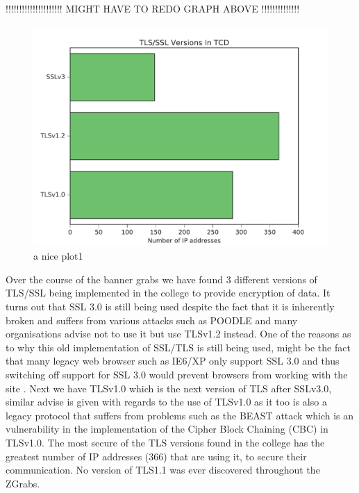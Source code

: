 \documentclass[a4wide,leqno,12pt]{report}
\begin{document}
!!!!!!!!!!!!!!!!!!!!! MIGHT HAVE TO REDO GRAPH ABOVE !!!!!!!!!!!!!!\\



\begin{figure}[h!]
\includegraphics[scale=.5]{pdf_images/TLSVersionsInTCD}
\caption{a nice plot1}
\label{fig:TLS_SSL}
\end{figure}

Over the course of the banner grabs we have found 3 different versions of TLS/SSL being implemented in the college to provide encryption of data. It turns out that SSL 3.0 is still being used despite the fact that it is inherently broken and suffers from various attacks such as POODLE\cite{holz2015summarizing} \cite{moller2014poodle} and many organisations \cite{ssllabs} advise not to use it  but use TLSv1.2 instead. One of the reasons as to why this old implementation of SSL/TLS is still being used, might be the fact that many legacy web browser such as IE6/XP only support SSL 3.0 and thus switching off support for SSL 3.0 would prevent browsers from working with the site \cite{owaspTLS_SSL}. Next we have TLSv1.0 which is the next version of TLS after SSLv3.0, similar advise is given with regards to the use of TLSv1.0 as it too is also a legacy protocol that suffers from problems such as the BEAST attack\cite{holz2015summarizing} which is an vulnerability in the implementation of the Cipher Block Chaining (CBC) in TLSv1.0. The most secure of the TLS versions found in the college has the greatest number of IP addresses (366) that are using it, to secure their communication. No version of TLS1.1 was ever discovered throughout the ZGrabs.
\end{document}
